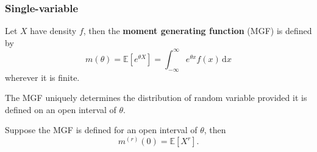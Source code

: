 \subsubsection*{Single-variable}
\begin{definition}
    Let $X$ have density $f$, then the \textbf{moment generating function} (MGF) is defined by
    $$m(\theta)=\mathbb E[e^{\theta X}]=\int_{-\infty}^\infty e^{\theta x}f(x)\,\mathrm dx$$
    wherever it is finite.
\end{definition}
\begin{theorem}
    The MGF uniquely determines the distribution of random variable provided it is defined on an open interval of $ \theta $.
\end{theorem}
\begin{theorem}
    Suppose the MGF is defined for an open interval of $ \theta $, then
    \[
        m^{(r)}(0)=\mathbb E[X^r].
    \]
\end{theorem}
